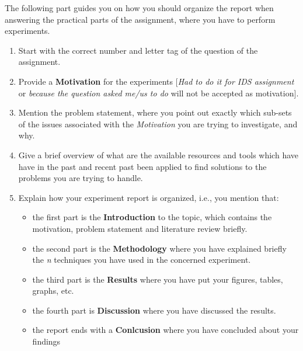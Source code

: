 \documentclass[a4paper]{article}
\begin{document}
The following part guides you on how you should organize the report when answering the practical parts of the assignment, where you have to perform experiments.
\begin{enumerate}
 \item Start with the correct number and letter tag of the question of the assignment.
 \item Provide a \textbf{Motivation} for the experiments [\textit{Had to do it for IDS assignment} or \textit{because the question asked me/us to do} will not be accepted as motivation]. 
 \item Mention the problem statement, where you point out exactly which sub-sets of the issues associated with the \textit{Motivation} you are trying to investigate, and why.
 \item Give a brief overview of what are the available resources and tools which have have in the past and recent past been applied to find solutions to the problems you are trying to handle. 
 \item Explain how your experiment report is organized, i.e., you mention that:
 \begin{itemize}
  \item the first part is the \textbf{Introduction} to the topic, which contains the motivation, problem statement and literature review briefly.
  \item the second part is the \textbf{Methodology} where you have explained briefly the \textit{n} techniques you have used in the concerned experiment.
  \item the third part is the \textbf{Results} where you have put your figures, tables, graphs, etc. 
  \item the fourth part is \textbf{Discussion} where you have discussed the results.
  \item the report ends with a \textbf{Conlcusion} where you have concluded about your findings 
 \end{itemize}

\end{enumerate}
\end{document}
